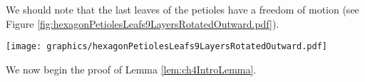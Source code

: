 
We should note that the last leaves of the petioles have a freedom of motion (see Figure \ref{fig:hexagonPetiolesLeafs9LayersRotatedOutward.pdf}).  

\begin{minipage}{\linewidth}
\begin{center}
\texttt{[image: graphics/hexagonPetiolesLeafs9LayersRotatedOutward.pdf]}
\label{fig:hexagonPetiolesLeafs9LayersRotatedOutward.pdf}
\end{center}
\end{minipage}

We now begin the proof of Lemma \ref{lem:ch4IntroLemma}.

